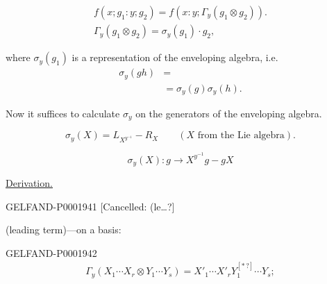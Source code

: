 \begin{gather*}
f (x; g_1: y; g_2)=f (x: y;\Gamma_y (g_1\otimes g_2)).\\
\Gamma_y (g_1\otimes g_2)=\sigma_y (g_1)\cdot g_2,
\end{gather*}



where $\sigma_y (g_1)$ is a representation of the enveloping algebra, i.e.
\begin{align*}
\sigma_y (gh)&=\\
&=\sigma_y (g)\sigma_y (h).
\end{align*}



Now it suffices to calculate $\sigma_y$ on the generators of the enveloping algebra.



\begin{equation*}
\sigma_y (X)=L_{X^{y^{-1}}}-R_X\qquad (X\text{ from the Lie algebra}).
\end{equation*}



\begin{equation*}\sigma_y (X): g\longrightarrow X^{y^{-1}}g-gX\end{equation*}



\underline{\underline{Derivation.}}



\begin{GelfandAdjacentEvidence}{GELFAND-P000194}{1}
[Cancelled: (le…?]
\end{GelfandAdjacentEvidence}

\par\noindent\begin{minipage}{\linewidth}
(leading term)—on a basis:



\begin{GelfandAdjacentEvidence}{GELFAND-P000194}{2}
\begin{gather*}
\Gamma_y (X_1\cdots X_r\otimes Y_1\cdots Y_s)
=X'_1\cdots X'_rY_1^{[\ast\,?]}\cdots Y_s;
\end{gather*}
\end{GelfandAdjacentEvidence}
\end{minipage}\par


